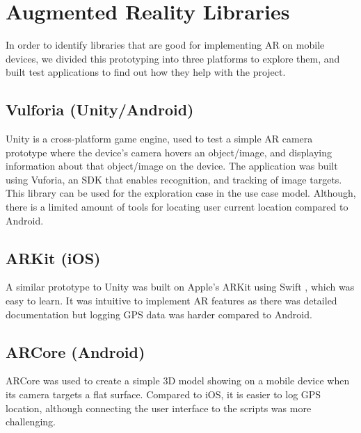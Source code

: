
\section{Augmented Reality Libraries}
In order to identify libraries that are good for implementing AR on mobile devices, we divided this prototyping into three platforms to explore them, and built test applications to find out how they help with the project.

\subsection*{Vulforia (Unity/Android)}
Unity is a cross-platform game engine, used to test a simple AR camera prototype where the device's camera hovers an object/image, and displaying information about that object/image on the device. The application was built using Vuforia, an SDK that enables recognition, and tracking of image targets. This library can be used for the exploration case in the use case model. Although, there is a limited amount of tools for locating user current location compared to Android.

\subsection*{ARKit (iOS)}
A similar prototype to Unity was built on Apple's ARKit using Swift \cite{applear}, which was easy to learn. It was intuitive to implement AR features as there was detailed documentation but logging GPS data was harder compared to Android.

\subsection*{ARCore (Android)}
ARCore was used to create a simple 3D model showing on a mobile device when its camera targets a flat surface. Compared to iOS, it is easier to log GPS location, although connecting the user interface to the scripts was more challenging.

